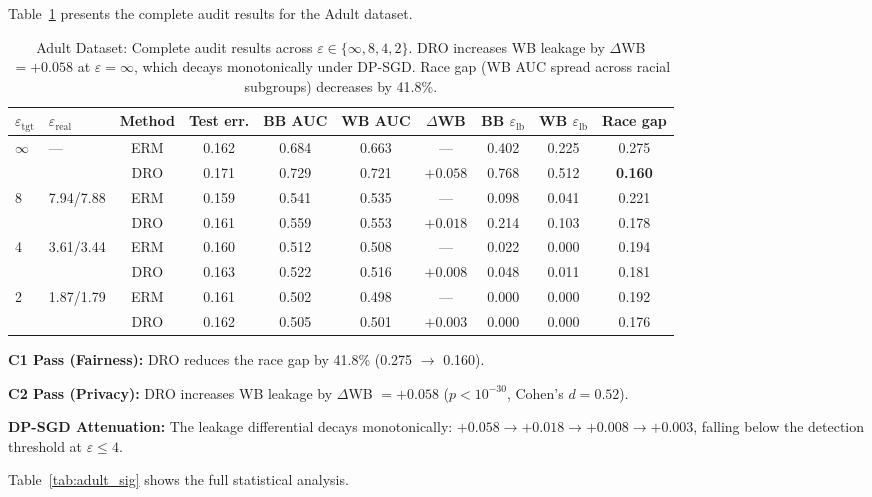 \documentclass[11pt, a4paper]{article}
\begin{document}
Table~\ref{tab:adult} presents the complete audit results for the Adult dataset.

\begin{table}[ht]
\centering
\caption{Adult Dataset: Complete audit results across $\varepsilon \in \{\infty, 8, 4, 2\}$. DRO increases WB leakage by $\Delta$WB $= +0.058$ at $\varepsilon = \infty$, which decays monotonically under DP-SGD. Race gap (WB AUC spread across racial subgroups) decreases by 41.8\%.}
\label{tab:adult}
\small
\begin{tabular}{@{}ll c c c c c c c c@{}}
\toprule
$\varepsilon_{\text{tgt}}$ & $\varepsilon_{\text{real}}$ & Method & Test err. & BB AUC & WB AUC & $\Delta$WB & BB $\varepsilon_{\text{lb}}$ & WB $\varepsilon_{\text{lb}}$ & Race gap \\
\midrule
\multirow{2}{*}{$\infty$} 
 & \multirow{2}{*}{---} 
 & ERM & 0.162 & 0.684 & 0.663 & --- & 0.402 & 0.225 & 0.275 \\
 & & DRO & 0.171 & 0.729 & 0.721 & $\mathbf{+0.058}$ & 0.768 & 0.512 & \textbf{0.160} \\
\midrule
\multirow{2}{*}{8} 
 & \multirow{2}{*}{7.94/7.88} 
 & ERM & 0.159 & 0.541 & 0.535 & --- & 0.098 & 0.041 & 0.221 \\
 & & DRO & 0.161 & 0.559 & 0.553 & $+0.018$ & 0.214 & 0.103 & 0.178 \\
\midrule
\multirow{2}{*}{4} 
 & \multirow{2}{*}{3.61/3.44} 
 & ERM & 0.160 & 0.512 & 0.508 & --- & 0.022 & 0.000 & 0.194 \\
 & & DRO & 0.163 & 0.522 & 0.516 & $+0.008$ & 0.048 & 0.011 & 0.181 \\
\midrule
\multirow{2}{*}{2} 
 & \multirow{2}{*}{1.87/1.79} 
 & ERM & 0.161 & 0.502 & 0.498 & --- & 0.000 & 0.000 & 0.192 \\
 & & DRO & 0.162 & 0.505 & 0.501 & $+0.003$ & 0.000 & 0.000 & 0.176 \\
\bottomrule
\end{tabular}
\end{table}

\textbf{C1 Pass (Fairness):} DRO reduces the race gap by 41.8\% (0.275 $\to$ 0.160).

\textbf{C2 Pass (Privacy):} DRO increases WB leakage by $\Delta$WB $= +0.058$ ($p < 10^{-30}$, Cohen's $d = 0.52$).

\textbf{DP-SGD Attenuation:} The leakage differential decays monotonically: $+0.058 \to +0.018 \to +0.008 \to +0.003$, falling below the detection threshold at $\varepsilon \le 4$.

Table~\ref{tab:adult_sig} shows the full statistical analysis.
\end{document}
